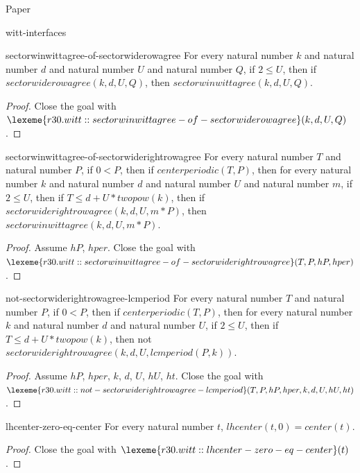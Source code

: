 \begin{lexlean}{Paper}
\begin{section}{witt-interfaces}
  \begin{theorem}{sectorwinwittagree-of-sectorwiderowagree}
  For every natural number \(k\) and natural number \(d\) and natural number \(U\) and natural number \(Q\), if \(2 ≤ U\), then if \(sectorwiderowagree(k, d, U, Q)\), then \(sectorwinwittagree(k, d, U, Q)\).
  \begin{proof}
  Close the goal with \(\lexeme{r30.witt::sectorwinwittagree-of-sectorwiderowagree}(k, d, U, Q)\).
  \end{proof}
  \end{theorem}

  \begin{theorem}{sectorwinwittagree-of-sectorwiderightrowagree}
  For every natural number \(T\) and natural number \(P\), if \(0 < P\), then if \(centerperiodic(T, P)\), then for every natural number \(k\) and natural number \(d\) and natural number \(U\) and natural number \(m\), if \(2 ≤ U\), then if \(T ≤ d + U * twopow(k)\), then if \(sectorwiderightrowagree(k, d, U, m * P)\), then \(sectorwinwittagree(k, d, U, m * P)\).
  \begin{proof}
  Assume \(hP\), \(hper\).
  Close the goal with \(\lexeme{r30.witt::sectorwinwittagree-of-sectorwiderightrowagree}(T, P, hP, hper)\).
  \end{proof}
  \end{theorem}

  \begin{theorem}{not-sectorwiderightrowagree-lcmperiod}
  For every natural number \(T\) and natural number \(P\), if \(0 < P\), then if \(centerperiodic(T, P)\), then for every natural number \(k\) and natural number \(d\) and natural number \(U\), if \(2 ≤ U\), then if \(T ≤ d + U * twopow(k)\), then not \(sectorwiderightrowagree(k, d, U, lcmperiod(P, k))\).
  \begin{proof}
  Assume \(hP\), \(hper\), \(k\), \(d\), \(U\), \(hU\), \(ht\).
  Close the goal with \(\lexeme{r30.witt::not-sectorwiderightrowagree-lcmperiod}(T, P, hP, hper, k, d, U, hU, ht)\).
  \end{proof}
  \end{theorem}

  \begin{theorem}{lhcenter-zero-eq-center}
  For every natural number \(t\), \(lhcenter(t, 0) = center(t)\).
  \begin{proof}
  Close the goal with \(\lexeme{r30.witt::lhcenter-zero-eq-center}(t)\).
  \end{proof}
  \end{theorem}


\end{section}
\end{lexlean}
